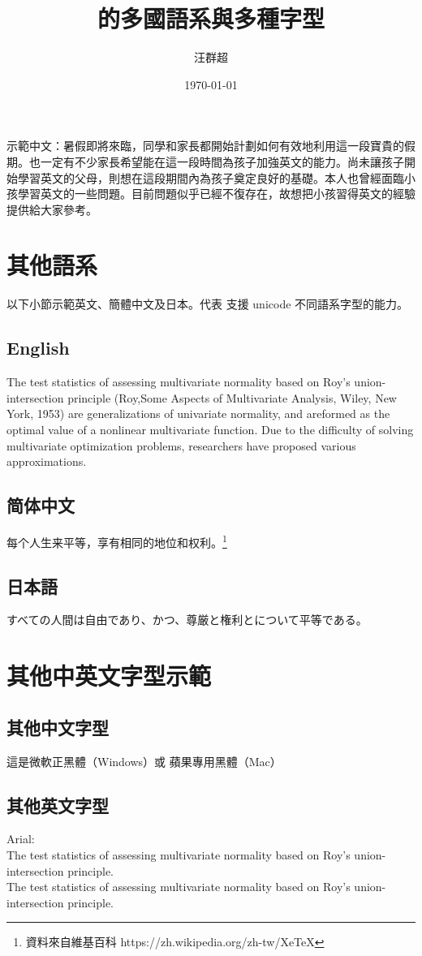 \documentclass[12pt, a4paper]{article}
\title{ \XeLaTeX 的多國語系與多種字型}
\author{汪群超}
\date{\today }
\begin{document}
\maketitle
\fontsize{12}{22pt}\selectfont %

示範中文：暑假即將來臨，同學和家長都開始計劃如何有效地利用這一段寶貴的假期。也一定有不少家長希望能在這一段時間為孩子加強英文的能力。尚未讓孩子開始學習英文的父母，則想在這段期間內為孩子奠定良好的基礎。本人也曾經面臨小孩學習英文的一些問題。目前問題似乎已經不復存在，故想把小孩習得英文的經驗提供給大家參考。

\section{其他語系}
以下小節示範英文、簡體中文及日本。代表 \XeTeX 支援 unicode 不同語系字型的能力。
\subsection{English}
The test statistics of assessing multivariate normality based on Roy's union-intersection principle (Roy,Some Aspects of Multivariate Analysis, Wiley, New York, 1953) are generalizations of univariate normality, and areformed as the optimal value of a nonlinear multivariate function. Due to the difficulty of solving multivariate optimization problems, researchers have proposed various approximations.

\subsection{简体中文}
每个人生来平等，享有相同的地位和权利。\footnote{資料來自維基百科 https://zh.wikipedia.org/zh-tw/XeTeX}

\subsection{日本語}
すべての人間は自由であり、かつ、尊厳と権利とについて平等である。

\section{其他中英文字型示範}
\subsection{其他中文字型}
{\MB 這是微軟正黑體（Windows）或 蘋果專用黑體（Mac）}

\subsection{其他英文字型}
{\A Arial:}\\
{\A The test statistics of assessing multivariate normality based on Roy's union-intersection principle.}\\

{\T The test statistics of assessing multivariate normality based on Roy's union-intersection principle.}
\end{document}
